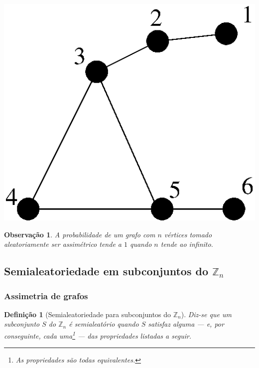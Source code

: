 \documentclass{beamer}
\def\MMZ{\mathbb{Z}} %
\theoremstyle{teoaxicorlem}
\theoremstyle{defnotnom}
\newtheorem{Def}{Definição}
\newtheorem{Obs}{Observação}
\begin{document}
\begin{frame}
  \includegraphics[width=.2\paperwidth]{assimetrico.eps}
  \vfill
  \begin{Obs}
    A probabilidade de um
    grafo com $n$ vértices tomado aleatoriamente ser assimétrico tende a
    $1$ quando $n$ tende ao infinito.
  \end{Obs}
\end{frame}

\subsection{Semialeatoriedade em subconjuntos do $\MMZ_n$}

\begin{frame}
  \frametitle{Assimetria de grafos}
  \begin{Def}[Semialeatoriedade para subconjuntos do $\MMZ_n$]
    Diz-se que um subconjunto $S$ do $\MMZ_n$ é \alert{semialeatório}
    quando $S$ satisfaz alguma --- e, por conseguinte, cada
    uma\footnote{As propriedades são todas equivalentes.} --- das
    propriedades listadas a seguir.
  \end{Def}
\end{frame}
\end{document}
